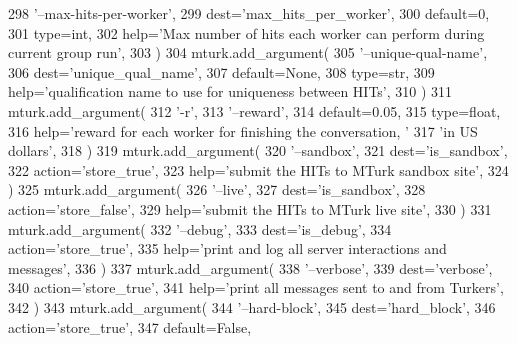 \begin{DoxyCode}
298             \textcolor{stringliteral}{'--max-hits-per-worker'},
299             dest=\textcolor{stringliteral}{'max\_hits\_per\_worker'},
300             default=0,
301             type=int,
302             help=\textcolor{stringliteral}{'Max number of hits each worker can perform during current group run'},
303         )
304         mturk.add\_argument(
305             \textcolor{stringliteral}{'--unique-qual-name'},
306             dest=\textcolor{stringliteral}{'unique\_qual\_name'},
307             default=\textcolor{keywordtype}{None},
308             type=str,
309             help=\textcolor{stringliteral}{'qualification name to use for uniqueness between HITs'},
310         )
311         mturk.add\_argument(
312             \textcolor{stringliteral}{'-r'},
313             \textcolor{stringliteral}{'--reward'},
314             default=0.05,
315             type=float,
316             help=\textcolor{stringliteral}{'reward for each worker for finishing the conversation, '}
317             \textcolor{stringliteral}{'in US dollars'},
318         )
319         mturk.add\_argument(
320             \textcolor{stringliteral}{'--sandbox'},
321             dest=\textcolor{stringliteral}{'is\_sandbox'},
322             action=\textcolor{stringliteral}{'store\_true'},
323             help=\textcolor{stringliteral}{'submit the HITs to MTurk sandbox site'},
324         )
325         mturk.add\_argument(
326             \textcolor{stringliteral}{'--live'},
327             dest=\textcolor{stringliteral}{'is\_sandbox'},
328             action=\textcolor{stringliteral}{'store\_false'},
329             help=\textcolor{stringliteral}{'submit the HITs to MTurk live site'},
330         )
331         mturk.add\_argument(
332             \textcolor{stringliteral}{'--debug'},
333             dest=\textcolor{stringliteral}{'is\_debug'},
334             action=\textcolor{stringliteral}{'store\_true'},
335             help=\textcolor{stringliteral}{'print and log all server interactions and messages'},
336         )
337         mturk.add\_argument(
338             \textcolor{stringliteral}{'--verbose'},
339             dest=\textcolor{stringliteral}{'verbose'},
340             action=\textcolor{stringliteral}{'store\_true'},
341             help=\textcolor{stringliteral}{'print all messages sent to and from Turkers'},
342         )
343         mturk.add\_argument(
344             \textcolor{stringliteral}{'--hard-block'},
345             dest=\textcolor{stringliteral}{'hard\_block'},
346             action=\textcolor{stringliteral}{'store\_true'},
347             default=\textcolor{keyword}{False},

\end{DoxyCode}
